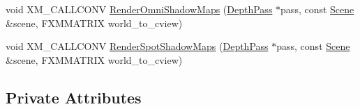 \begin{DoxyCompactItemize}
\item 
void X\+M\+\_\+\+C\+A\+L\+L\+C\+O\+NV \hyperlink{structmage_1_1_l_buffer_pass_ae852ab53bcf57c9469fa6cf530c3009d}{Render\+Omni\+Shadow\+Maps} (\hyperlink{classmage_1_1_depth_pass}{Depth\+Pass} $\ast$pass, const \hyperlink{classmage_1_1_scene}{Scene} \&scene, F\+X\+M\+M\+A\+T\+R\+IX world\+\_\+to\+\_\+cview)
\item 
void X\+M\+\_\+\+C\+A\+L\+L\+C\+O\+NV \hyperlink{structmage_1_1_l_buffer_pass_a9db1903df31224e36ebff1271aceca41}{Render\+Spot\+Shadow\+Maps} (\hyperlink{classmage_1_1_depth_pass}{Depth\+Pass} $\ast$pass, const \hyperlink{classmage_1_1_scene}{Scene} \&scene, F\+X\+M\+M\+A\+T\+R\+IX world\+\_\+to\+\_\+cview)
\end{DoxyCompactItemize}
\subsection*{Private Attributes}
